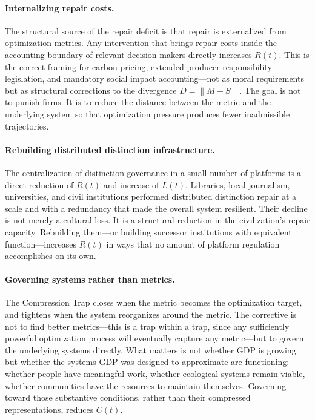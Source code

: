 \documentclass[11pt, letterpaper]{article}
\begin{document}
\paragraph{Internalizing repair costs.} The structural source of the repair deficit is that repair is externalized from optimization metrics. Any intervention that brings repair costs inside the accounting boundary of relevant decision-makers directly increases $R(t)$. This is the correct framing for carbon pricing, extended producer responsibility legislation, and mandatory social impact accounting---not as moral requirements but as structural corrections to the divergence $D = \|M - S\|$. The goal is not to punish firms. It is to reduce the distance between the metric and the underlying system so that optimization pressure produces fewer inadmissible trajectories.

\paragraph{Rebuilding distributed distinction infrastructure.} The centralization of distinction governance in a small number of platforms is a direct reduction of $R(t)$ and increase of $L(t)$. Libraries, local journalism, universities, and civil institutions performed distributed distinction repair at a scale and with a redundancy that made the overall system resilient. Their decline is not merely a cultural loss. It is a structural reduction in the civilization's repair capacity. Rebuilding them---or building successor institutions with equivalent function---increases $R(t)$ in ways that no amount of platform regulation accomplishes on its own.

\paragraph{Governing systems rather than metrics.} The Compression Trap closes when the metric becomes the optimization target, and tightens when the system reorganizes around the metric. The corrective is not to find better metrics---this is a trap within a trap, since any sufficiently powerful optimization process will eventually capture any metric---but to govern the underlying systems directly. What matters is not whether GDP is growing but whether the systems GDP was designed to approximate are functioning: whether people have meaningful work, whether ecological systems remain viable, whether communities have the resources to maintain themselves. Governing toward those substantive conditions, rather than their compressed representations, reduces $C(t)$.
\end{document}

